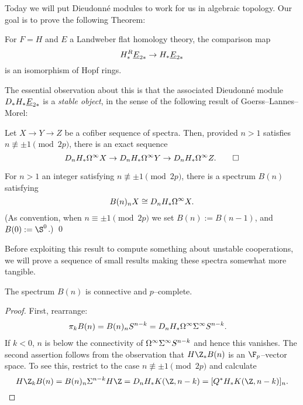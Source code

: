 Today we will put Dieudonn\'e modules to work for us in algebraic topology.  Our goal is to prove the following Theorem:
\begin{theorem}
For $F = H$ and $E$ a Landweber flat homology theory, the comparison map \[H_*^R \underline{\smash{E}}_{2*} \to H_* \underline{\smash{E}}_{2*}\] is an isomorphism of Hopf rings.
\end{theorem}

\noindent The essential observation about this is that the associated Dieudonn\'e module $D_* H_* \underline{\smash{E}}_{2*}$ is a \emph{stable object}, in the sense of the following result of Goerss--Lannes--Morel:

\begin{theorem}
Let $X \to Y \to Z$ be a cofiber sequence of spectra.  Then, provided $n > 1$ satisfies $n \not\equiv \pm 1 \pmod{2p}$, there is an exact sequence \[D_n H_* \Omega^\infty X \to D_n H_* \Omega^\infty Y \to D_n H_* \Omega^\infty Z. \qed\]
\end{theorem}

\begin{corollary}
For $n > 1$ an integer satisfying $n \not\equiv \pm 1 \pmod{2p}$, there is a spectrum $B(n)$ satisfying \[B(n)_n X \cong D_n H_* \Omega^\infty X.\] (As convention, when $n \equiv \pm 1 \pmod{2p}$ we set $B(n) := B(n-1)$, and $B(0) := \S^0$.)   \qed
\end{corollary}

Before exploiting this result to compute something about unstable cooperations, we will prove a sequence of small results making these spectra somewhat more tangible.

\begin{lemma}
The spectrum $B(n)$ is connective and $p$--complete.
\end{lemma}
\begin{proof}
First, rearrange:
\begin{align*}
\pi_k B(n) & = B(n)_n S^{n-k} = D_n H_* \Omega^\infty \Sigma^\infty S^{n-k}.
\end{align*}
If $k < 0$, $n$ is below the connectivity of $\Omega^\infty \Sigma^\infty S^{n-k}$ and hence this vanishes.  The second assertion follows from the observation that $H\Z_* B(n)$ is an $\F_p$--vector space.  To see this, restrict to the case $n \not\equiv \pm 1 \pmod{2p}$ and calculate \[H\Z_k B(n) = B(n)_n \Susp^{n-k} H\Z = D_n H_* K(\Z, n-k) = [Q^* H_* K(\Z, n-k)]_n. \qedhere\]
\end{proof}

